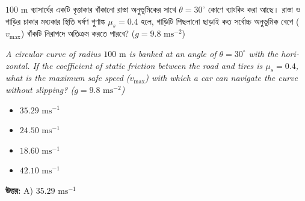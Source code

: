 \documentclass[12pt, a4paper]{article}
\begin{document}
\begin{tcolorbox}[questionbox={প্রশ্ন (Question) 2}]
\noindent
$100\text{ m}$ ব্যাসার্ধের একটি বৃত্তাকার বাঁকানো রাস্তা অনুভূমিকের সাথে $\theta = 30^\circ$ কোণে ব্যাংকিং করা আছে। রাস্তা ও গাড়ির চাকার মধ্যকার স্থিতি ঘর্ষণ গুণাঙ্ক $\mu_s = 0.4$ হলে, গাড়িটি পিছলানো ছাড়াই কত সর্বোচ্চ অনুভূমিক বেগে ($v_{\text{max}}$) বাঁকটি নিরাপদে অতিক্রম করতে পারবে? ($g = 9.8\text{ ms}^{-2}$)
\vspace{0.8em}
\begin{english}
\noindent\textit{\color{darkgray}
A circular curve of radius $100\text{ m}$ is banked at an angle of $\theta = 30^\circ$ with the horizontal. If the coefficient of static friction between the road and tires is $\mu_s = 0.4$, what is the maximum safe speed ($v_{\text{max}}$) with which a car can navigate the curve without slipping? ($g = 9.8\text{ ms}^{-2}$)
}
\end{english}
\end{tcolorbox}

\begin{itemize}[label={}, leftmargin=1cm, itemsep=0.5em]
\item[\textbf{A)}] $35.29\text{ ms}^{-1}$
\item[\textbf{B)}] $24.50\text{ ms}^{-1}$
\item[\textbf{C)}] $18.60\text{ ms}^{-1}$
\item[\textbf{D)}] $42.10\text{ ms}^{-1}$
\end{itemize}
\vspace{0.5em}

\begin{tcolorbox}[answerbox]
\textbf{\color{success} উত্তর:} A) $35.29\text{ ms}^{-1}$
\end{tcolorbox}
\vspace{1em}
\end{document}
